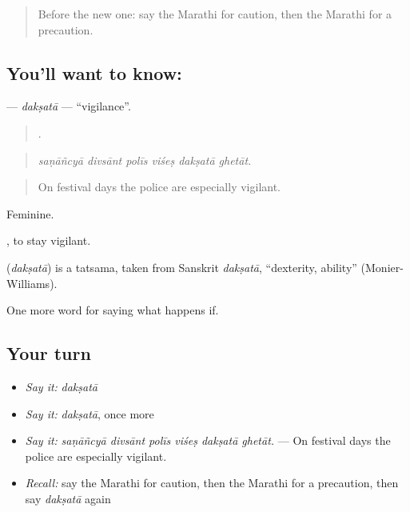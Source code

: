 \label{lesson:MR-C541-daksata}



\begin{quote}
Before the new one: say the Marathi for caution, then the Marathi for a precaution.
\end{quote}

\subsection*{You'll want to know: }
\textbf{} — \emph{dakṣatā} — \textquotedblleft{}vigilance\textquotedblright{}.

\begin{quote}
     .
\end{quote}

\begin{quote}
\emph{saṇāñcyā divsānt polīs viśeṣ dakṣatā ghetāt.}
\end{quote}

\begin{quote}
On festival days the police are especially vigilant.
\end{quote}

Feminine.

 , to stay vigilant.

\begin{cousinweb}
\textbf{} (\emph{dakṣatā}) is a tatsama, taken from Sanskrit \emph{dakṣatā}, \textquotedblleft{}dexterity, ability\textquotedblright{} (Monier-Williams).
\end{cousinweb}

\begin{grammarlens}[title={What you've built}]
One more word for saying what happens if.
\end{grammarlens}

\subsection*{Your turn}
\begin{itemize}
\raggedright
  \item \emph{Say it:} \emph{dakṣatā}
  \item \emph{Say it:} \emph{dakṣatā}, once more
  \item \emph{Say it:} \emph{saṇāñcyā divsānt polīs viśeṣ dakṣatā ghetāt.} — On festival days the police are especially vigilant.
  \item \emph{Recall:} say the Marathi for caution, then the Marathi for a precaution, then say \emph{dakṣatā} again
\end{itemize}

